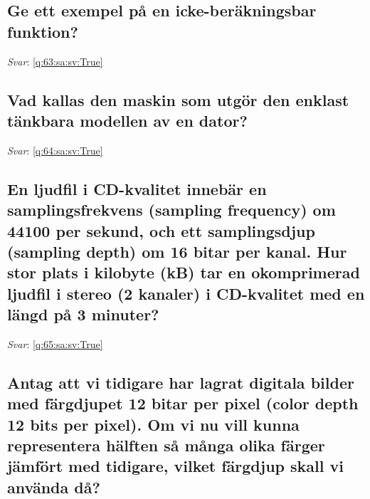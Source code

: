 \documentclass[a4paper,11pt,oneside]{article}
\begin{document}
\begin{sloppypar}
\subsection{Ge ett exempel p\r{a} en icke-ber\"akningsbar funktion?}

\label{q:63:sa:sv:False}

\vspace{2cm}

\noindent\makebox[\textwidth]{\hrulefill}

\vspace{1cm}

\textit{Svar}: \autoref{q:63:sa:sv:True}



\subsection{Vad kallas den maskin som utg\"or den enklast t\"ankbara modellen av en dator?}

\label{q:64:sa:sv:False}

\vspace{2cm}

\noindent\makebox[\textwidth]{\hrulefill}

\vspace{1cm}

\textit{Svar}: \autoref{q:64:sa:sv:True}



\subsection{En ljudfil i CD-kvalitet inneb\"ar en samplingsfrekvens (sampling frequency) om 44100 per sekund, och ett samplingsdjup (sampling depth) om 16 bitar per kanal. Hur stor plats i kilobyte (kB) tar en okomprimerad ljudfil i stereo (2 kanaler) i CD-kvalitet med en l\"angd p\r{a} 3 minuter?}

\label{q:65:sa:sv:False}

\vspace{2cm}

\noindent\makebox[\textwidth]{\hrulefill}

\vspace{1cm}

\textit{Svar}: \autoref{q:65:sa:sv:True}



\subsection{Antag att vi tidigare har lagrat digitala bilder med f\"argdjupet 12 bitar per pixel (color depth 12 bits per pixel). Om vi nu vill kunna representera h\"alften s\r{a} m\r{a}nga olika f\"arger j\"amf\"ort med tidigare, vilket f\"argdjup skall vi anv\"anda d\r{a}?}


\end{sloppypar}
\end{document}
